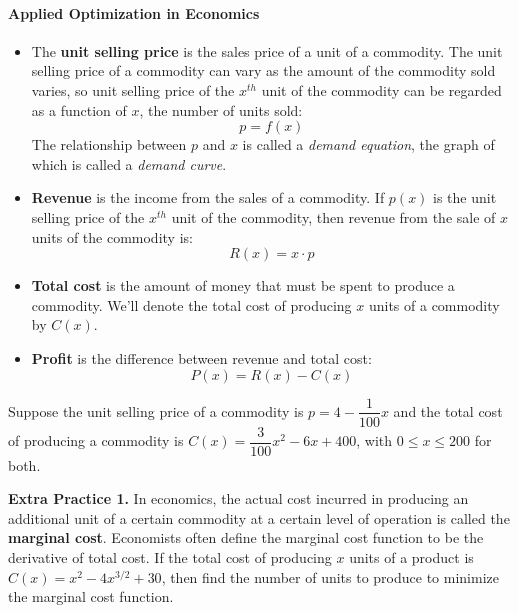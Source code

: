 \documentclass[10pt]{article}
\begin{document}
\vfill



\newpage%


\paragraph*{Applied Optimization in Economics}
\begin{itemize}
\item The {\bf unit selling price} is the sales price of a unit of a commodity. The unit selling price of a commodity can vary as the amount of the commodity sold varies, so unit selling price of the $x^{th}$ unit of the commodity can be regarded as a function of $x$, the number of units sold: 
\[p=f(x)\] 
The relationship between $p$ and $x$ is called a {\it demand equation}, the graph of which is called a {\it demand curve}.
\item {\bf Revenue} is the income from the sales of a commodity. If $p(x)$ is the unit selling price of the $x^{th}$ unit of the commodity, then revenue from the sale of $x$ units of the commodity is: \[R(x)=x\cdot p\]
\item {\bf Total cost} is the amount of money that must be spent to produce a commodity. We'll denote the total cost of producing $x$ units of a commodity by $C(x)$.
\item {\bf Profit} is the difference between revenue and total cost:
\[P(x) = R(x) - C(x)\]
\end{itemize}
%
{\exercise} Suppose the unit selling price of a commodity is $p=4-\dfrac1{100}x$ and the total cost of producing a commodity is $C(x)=\dfrac{3}{100}x^2-6x+400$, with $0\leq x\leq 200$ for both.\\


\vfill


\newpage%


{\bf\color{blue}Extra Practice 1.} In economics, the actual cost incurred in producing an additional unit of a certain commodity at a certain level of operation is called the {\bf marginal cost}. Economists often define the marginal cost function to be the derivative of total cost. If the total cost of producing $x$ units of a product is $C(x)=x^2-4x^{3/2}+30$, then find the number of units to produce to minimize the marginal cost function.
\end{document}
